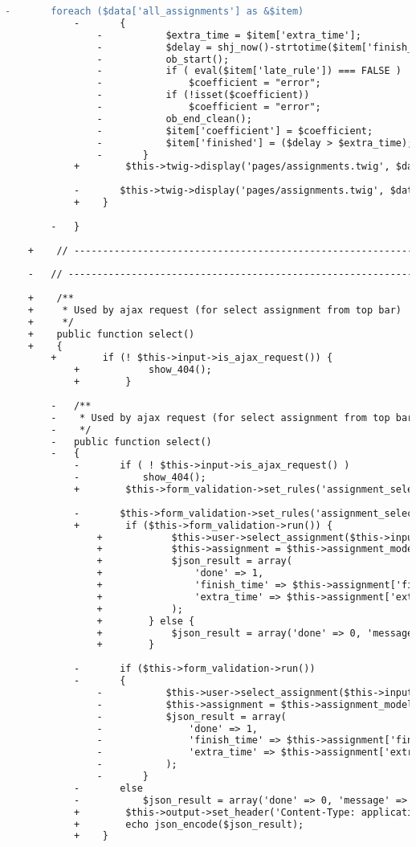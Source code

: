 \begin{lstlisting}[language=diff, caption=Perubahan pada kode Assignments.php]
			-		foreach ($data['all_assignments'] as &$item)
			-		{
				-			$extra_time = $item['extra_time'];
				-			$delay = shj_now()-strtotime($item['finish_time']);;
				-			ob_start();
				-			if ( eval($item['late_rule']) === FALSE )
				-				$coefficient = "error";
				-			if (!isset($coefficient))
				-				$coefficient = "error";
				-			ob_end_clean();
				-			$item['coefficient'] = $coefficient;
				-			$item['finished'] = ($delay > $extra_time);
				-		}
			+        $this->twig->display('pages/assignments.twig', $data);
			
			-		$this->twig->display('pages/assignments.twig', $data);
			+    }
		
		-	}
	
	+    // ------------------------------------------------------------------------
	
	-	// ------------------------------------------------------------------------
	
	+    /**
	+     * Used by ajax request (for select assignment from top bar)
	+     */
	+    public function select()
	+    {
		+        if (! $this->input->is_ajax_request()) {
			+            show_404();
			+        }
		
		-	/**
		-	 * Used by ajax request (for select assignment from top bar)
		-	 */
		-	public function select()
		-	{
			-		if ( ! $this->input->is_ajax_request() )
			-			show_404();
			+        $this->form_validation->set_rules('assignment_select', 'Assignment', 'required|integer|greater_than[0]');
			
			-		$this->form_validation->set_rules('assignment_select', 'Assignment', 'required|integer|greater_than[0]');
			+        if ($this->form_validation->run()) {
				+            $this->user->select_assignment($this->input->post('assignment_select'));
				+            $this->assignment = $this->assignment_model->assignment_info($this->input->post('assignment_select'));
				+            $json_result = array(
				+                'done' => 1,
				+                'finish_time' => $this->assignment['finish_time'],
				+                'extra_time' => $this->assignment['extra_time'],
				+            );
				+        } else {
				+            $json_result = array('done' => 0, 'message' => 'Input Error');
				+        }
			
			-		if ($this->form_validation->run())
			-		{
				-			$this->user->select_assignment($this->input->post('assignment_select'));
				-			$this->assignment = $this->assignment_model->assignment_info($this->input->post('assignment_select'));
				-			$json_result = array(
				-				'done' => 1,
				-				'finish_time' => $this->assignment['finish_time'],
				-				'extra_time' => $this->assignment['extra_time'],
				-			);
				-		}
			-		else
			-			$json_result = array('done' => 0, 'message' => 'Input Error');
			+        $this->output->set_header('Content-Type: application/json; charset=utf-8');
			+        echo json_encode($json_result);
			+    }
		

\end{lstlisting}
